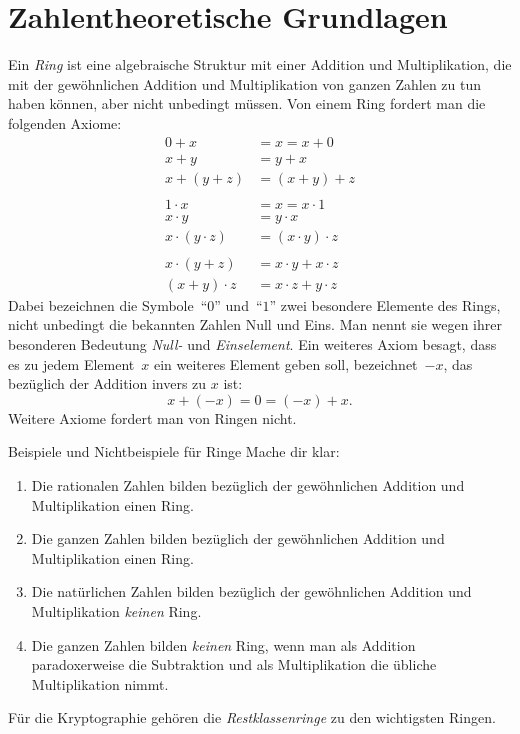 \documentclass{zirkelblatt}
\newcommand{\head}[1]{\section*{\rmfamily #1}}%
\begin{document}


\head{Zahlentheoretische Grundlagen}

Ein \emph{Ring} ist eine algebraische Struktur mit einer Addition und
Multiplikation, die mit der gewöhnlichen Addition und Multiplikation von ganzen
Zahlen zu tun haben können, aber nicht unbedingt müssen. Von einem Ring fordert
man die folgenden Axiome:
\begin{align*}
    0 + x &= x = x + 0 \\
    x + y &= y + x \\
    x + (y + z) &= (x + y) + z \\\\
    1 \cdot x &= x = x \cdot 1 \\
    x \cdot y &= y \cdot x \\
    x \cdot (y \cdot z) &= (x \cdot y) \cdot z \\\\
    x \cdot (y + z) &= x \cdot y + x \cdot z \\
    (x + y) \cdot z &= x \cdot z + y \cdot z
\end{align*}
Dabei bezeichnen die Symbole~"`$0$"' und~"`$1$"' zwei besondere Elemente des
Rings, nicht unbedingt die bekannten Zahlen Null und Eins. Man nennt sie wegen
ihrer besonderen Bedeutung \emph{Null-} und \emph{Einselement}. Ein weiteres
Axiom besagt, dass es zu jedem Element~$x$ ein weiteres Element geben soll,
bezeichnet~$-x$, das bezüglich der Addition invers zu $x$ ist:
\[ x + (-x) = 0 = (-x) + x. \]
Weitere Axiome fordert man von Ringen nicht.
\vspace{\aufgabenskip}

\begin{aufgabe}{Beispiele und Nichtbeispiele für Ringe}
Mache dir klar:
\begin{enumerate}
\item Die rationalen Zahlen bilden bezüglich der gewöhnlichen
Addition und Multiplikation einen Ring.
\item Die ganzen Zahlen bilden bezüglich der gewöhnlichen
Addition und Multiplikation einen Ring.
\item Die natürlichen Zahlen bilden bezüglich der gewöhnlichen Addition und
Multiplikation \emph{keinen} Ring.
\item Die ganzen Zahlen bilden \emph{keinen} Ring, wenn man als Addition
paradoxerweise die Subtraktion und als Multiplikation die übliche
Multiplikation nimmt.
\end{enumerate}
Für die Kryptographie gehören die \emph{Restklassenringe} zu den wichtigsten
Ringen.
\end{aufgabe}
\end{document}

